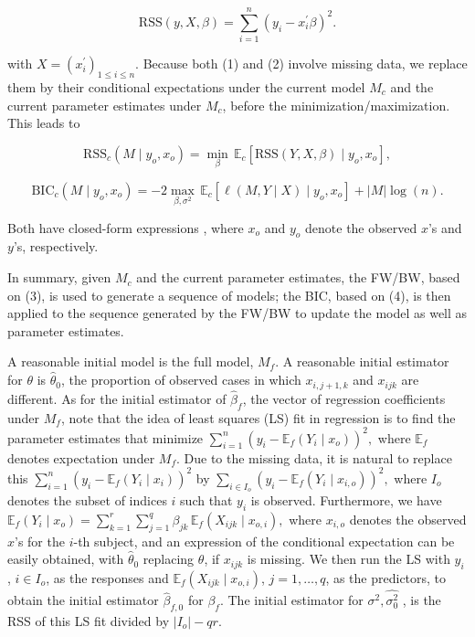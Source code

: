 \documentclass[
  12pt,
]{article}
\begin{document}
\begin{equation}
\text{RSS}(y, X, \beta)
= \sum_{i=1}^{n} (y_i - x_i^\prime \beta)^2. \tag{2}
\end{equation}

with \(X = (x^\prime_i)_{1 \le i \le n}\). Because both (1) and (2)
involve missing data, we replace them by their conditional expectations
under the current model \(M_c\) and the current parameter estimates
under \(M_c\), before the minimization/maximization. This leads to

\begin{equation}
\text{RSS}_c(M \mid y_o, x_o)
= \min_{\beta} \, \mathbb{E}_c \!\left[ \text{RSS}(Y, X, \beta) \mid y_o, x_o \right], \tag{3}
\end{equation}

\begin{equation}
\text{BIC}_c(M \mid y_o, x_o)
= -2 \max_{\beta, \sigma^2} \, \mathbb{E}_c \!\left[ \ell(M, Y \mid X) \mid y_o, x_o \right]
+ |M| \log(n). \tag{4}
\end{equation}

Both have closed-form expressions , where \(x_o\) and \(y_o\)
denote the observed \(x\)'s and \(y\)'s, respectively.

In summary, given \(M_c\) and the current parameter estimates, the
FW/BW, based on (3), is used to generate a sequence of models; the BIC,
based on (4), is then applied to the sequence generated by the FW/BW to
update the model as well as parameter estimates.

A reasonable initial model is the full model, \(M_f\). A reasonable
initial estimator for \(\theta\) is \(\hat{\theta}_0\), the proportion
of observed cases in which \(x_{i,j+1,k}\) and \(x_{ijk}\) are
different. As for the initial estimator of \(\hat{\beta}_f\), the vector
of regression coefficients under \(M_f\), note that the idea of least
squares (LS) fit in regression is to find the parameter estimates that
minimize \(\sum_{i=1}^{n} (y_i - \mathbb{E}_f(Y_i \mid x_o))^2,\) where
\(\mathbb{E}_f\) denotes expectation under \(M_f\). Due to the missing
data, it is natural to replace this
\(\sum_{i=1}^{n} (y_i - \mathbb{E}_f(Y_i \mid x_i))^2\) by
\(\sum_{i \in I_o} (y_i - \mathbb{E}_f(Y_i \mid x_{i,o}))^2,\) where
\(I_o\) denotes the subset of indices \(i\) such that \(y_i\) is
observed. Furthermore, we have
\(\mathbb{E}_f(Y_i \mid x_{o})= \sum_{k=1}^{r} \sum_{j=1}^{q} \beta_{jk} \, \mathbb{E}_f(X_{ijk} \mid x_{o,i}),\)
where \(x_{i,o}\) denotes the observed \(x\)'s for the \(i\)-th subject,
and an expression of the conditional expectation can be easily obtained,
with \(\hat{\theta}_0\) replacing \(\theta\), if \(x_{ijk}\) is missing.
We then run the LS with \(y_i\), \(i \in I_o\), as the responses and
\(\mathbb{E}_f(X_{ijk} \mid x_{o,i})\), \(j = 1, \ldots, q\), as the
predictors, to obtain the initial estimator \(\hat{\beta}_{f,0}\) for
\(\beta_f\). The initial estimator for \(\sigma^2 , \hat{\sigma^2_0}\) ,
is the RSS of this LS fit divided by \(|I_o| - qr\).
\end{document}
